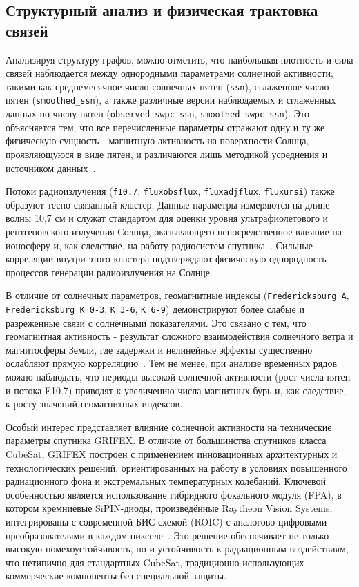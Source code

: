 \subsection{Структурный анализ и физическая трактовка связей}

Анализируя структуру графов, можно отметить, что наибольшая плотность и сила
связей наблюдается между однородными параметрами солнечной активности, такими
как среднемесячное число солнечных пятен (\texttt{ssn}), сглаженное число пятен
(\texttt{smoothed\_ssn}), а также различные версии наблюдаемых и сглаженных
данных по числу пятен (\texttt{observed\_swpc\_ssn},
\texttt{smoothed\_swpc\_ssn}). Это объясняется тем, что все перечисленные
параметры отражают одну и ту же физическую сущность - магнитную активность на
поверхности Солнца, проявляющуюся в виде пятен, и различаются лишь методикой
усреднения и источником данных~\cite{sidc_manual}.

Потоки радиоизлучения (\texttt{f10.7}, \texttt{fluxobsflux},
\texttt{fluxadjflux}, \texttt{fluxursi}) также образуют тесно связанный кластер.
Данные параметры измеряются на длине волны 10,7 см и служат стандартом для
оценки уровня ультрафиолетового и рентгеновского излучения Солнца, оказывающего
непосредственное влияние на ионосферу и, как следствие, на работу радиосистем
спутника~\cite{f107_standard}. Сильные корреляции внутри этого кластера
подтверждают физическую однородность процессов генерации радиоизлучения на
Солнце.

В отличие от солнечных параметров, геомагнитные индексы (\texttt{Fredericksburg
	A}, \texttt{Fredericksburg K 0-3}, \texttt{K 3-6}, \texttt{K 6-9}) демонстрируют
более слабые и разреженные связи с солнечными показателями. Это связано с тем,
что геомагнитная активность - результат сложного взаимодействия солнечного ветра
и магнитосферы Земли, где задержки и нелинейные эффекты существенно ослабляют
прямую корреляцию~\cite{geomag_handbook}. Тем не менее, при анализе временных
рядов можно наблюдать, что периоды высокой солнечной активности (рост числа
пятен и потока F10.7) приводят к увеличению числа магнитных бурь и, как
следствие, к росту значений геомагнитных индексов.

Особый интерес представляет влияние солнечной активности на технические
параметры спутника GRIFEX. В отличие от большинства спутников класса CubeSat,
GRIFEX построен с применением инновационных архитектурных и технологических
решений, ориентированных на работу в условиях повышенного радиационного фона и
экстремальных температурных колебаний. Ключевой особенностью является
использование гибридного фокального модуля (FPA), в котором кремниевые
SiPIN-диоды, произведённые Raytheon Vision Systems, интегрированы с современной
БИС-схемой (ROIC) с аналогово-цифровыми преобразователями в каждом
пикселе~\cite{norton2012spaceborne, eoportal_grifex}. Это решение обеспечивает
не только высокую помехоустойчивость, но и устойчивость к радиационным
воздействиям, что нетипично для стандартных CubeSat, традиционно использующих
коммерческие компоненты без специальной защиты.

